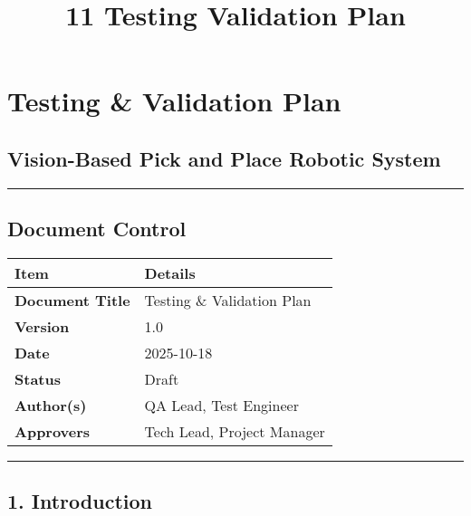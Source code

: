 \documentclass[
]{article}
\title{11 Testing Validation Plan}
\author{}
\date{}
\begin{document}
\maketitle

{
\setcounter{tocdepth}{3}
\tableofcontents
}
\hypertarget{testing-validation-plan}{%
\section{Testing \& Validation Plan}\label{testing-validation-plan}}

\hypertarget{vision-based-pick-and-place-robotic-system}{%
\subsection{Vision-Based Pick and Place Robotic
System}\label{vision-based-pick-and-place-robotic-system}}

\begin{center}\rule{0.5\linewidth}{0.5pt}\end{center}

\hypertarget{document-control}{%
\subsection{Document Control}\label{document-control}}

\begin{longtable}[]{@{}ll@{}}
\toprule\noalign{}
\textbf{Item} & \textbf{Details} \\
\midrule\noalign{}
\endhead
\bottomrule\noalign{}
\endlastfoot
\textbf{Document Title} & Testing \& Validation Plan \\
\textbf{Version} & 1.0 \\
\textbf{Date} & 2025-10-18 \\
\textbf{Status} & Draft \\
\textbf{Author(s)} & QA Lead, Test Engineer \\
\textbf{Approvers} & Tech Lead, Project Manager \\
\end{longtable}

\begin{center}\rule{0.5\linewidth}{0.5pt}\end{center}

\hypertarget{introduction}{%
\subsection{1. Introduction}\label{introduction}}
\end{document}
